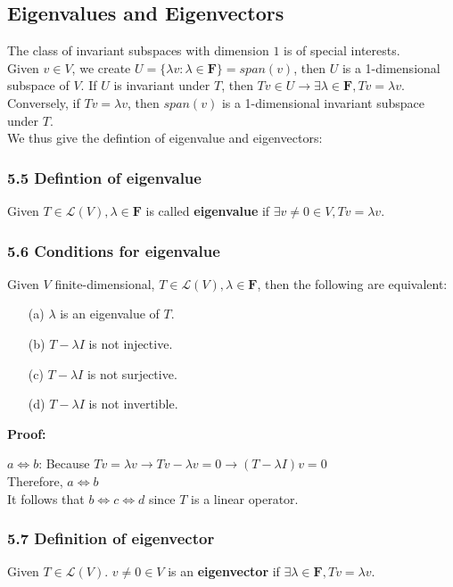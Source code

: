 \documentclass{article}
\begin{document}
\subsection*{Eigenvalues and Eigenvectors}
The class of invariant subspaces with dimension $1$ is of special interests.\\
Given $v \in V$, we create $U = \{\lambda v : \lambda \in \mathbf{F}\} = span(v)$, then $U$ is a 1-dimensional subspace of $V$. If $U$ is invariant under $T$, then $Tv \in U \rightarrow \exists \lambda \in \mathbf{F}, Tv = \lambda v$.\\
Conversely, if $Tv = \lambda v$, then $span(v)$ is a 1-dimensional invariant subspace under $T$.\\
We thus give the defintion of eigenvalue and eigenvectors:
\subsubsection*{5.5 Defintion of eigenvalue}
Given $T \in \mathcal{L}(V), \lambda \in \mathbf{F}$ is called \textbf{eigenvalue} if $\exists v \neq 0 \in V, Tv = \lambda v$.
\subsubsection*{5.6 Conditions for eigenvalue}
Given $V$ finite-dimensional, $T\in \mathcal{L}(V), \lambda \in \mathbf{F}$, then the following are equivalent:
\begin{enumerate}
    \item[(a)] $\lambda$ is an eigenvalue of $T$.
    \item[(b)] $T - \lambda I$ is not injective.
    \item[(c)] $T - \lambda I$ is not surjective.
    \item[(d)] $T - \lambda I$ is not invertible.
\end{enumerate}
\textbf{Proof:}
\begin{addmargin}[1em]{0em}
    $a \iff b$: Because $Tv = \lambda v \rightarrow Tv - \lambda v = 0 \rightarrow (T - \lambda I) v = 0$\\
    Therefore, $a \iff b$\\
    It follows that $b \iff c \iff d$ since $T$ is a linear operator.
\end{addmargin}
\subsubsection*{5.7 Definition of eigenvector}
Given $T \in \mathcal{L}(V)$. $v \neq 0 \in V$ is an \textbf{eigenvector} if $\exists \lambda \in \mathbf{F}, Tv = \lambda v$.
\end{document}
